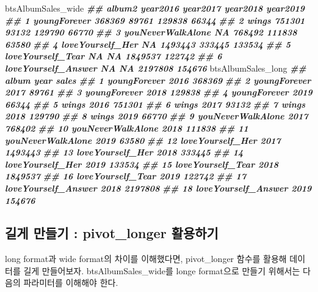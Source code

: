 \documentclass[
]{book}
\newenvironment{Shaded}{\begin{snugshade}}{\end{snugshade}}
\newcommand{\DocumentationTok}[1]{\textcolor[rgb]{0.56,0.35,0.01}{\textbf{\textit{#1}}}}
\newcommand{\NormalTok}[1]{#1}
\begin{document}
\begin{Shaded}
\begin{Highlighting}[]
\NormalTok{btsAlbumSales\_wide}
\DocumentationTok{\#\#                album2 year2016 year2017 year2018 year2019}
\DocumentationTok{\#\# 1        youngForever   368369    89761   129838    66344}
\DocumentationTok{\#\# 2               wings   751301    93132   129790    66770}
\DocumentationTok{\#\# 3   youNeverWalkAlone       NA   768492   111838    63580}
\DocumentationTok{\#\# 4    loveYourself\_Her       NA  1493443   333445   133534}
\DocumentationTok{\#\# 5   loveYourself\_Tear       NA       NA  1849537   122742}
\DocumentationTok{\#\# 6 loveYourself\_Answer       NA       NA  2197808   154676}
\NormalTok{btsAlbumSales\_long}
\DocumentationTok{\#\#                  album year   sales}
\DocumentationTok{\#\# 1         youngForever 2016  368369}
\DocumentationTok{\#\# 2         youngForever 2017   89761}
\DocumentationTok{\#\# 3         youngForever 2018  129838}
\DocumentationTok{\#\# 4         youngForever 2019   66344}
\DocumentationTok{\#\# 5                wings 2016  751301}
\DocumentationTok{\#\# 6                wings 2017   93132}
\DocumentationTok{\#\# 7                wings 2018  129790}
\DocumentationTok{\#\# 8                wings 2019   66770}
\DocumentationTok{\#\# 9    youNeverWalkAlone 2017  768402}
\DocumentationTok{\#\# 10   youNeverWalkAlone 2018  111838}
\DocumentationTok{\#\# 11   youNeverWalkAlone 2019   63580}
\DocumentationTok{\#\# 12    loveYourself\_Her 2017 1493443}
\DocumentationTok{\#\# 13    loveYourself\_Her 2018  333445}
\DocumentationTok{\#\# 14    loveYourself\_Her 2019  133534}
\DocumentationTok{\#\# 15   loveYourself\_Tear 2018 1849537}
\DocumentationTok{\#\# 16   loveYourself\_Tear 2019  122742}
\DocumentationTok{\#\# 17 loveYourself\_Answer 2018 2197808}
\DocumentationTok{\#\# 18 loveYourself\_Answer 2019  154676}
\end{Highlighting}
\end{Shaded}

\subsection{길게 만들기 : pivot\_longer 활용하기}\label{uxae38uxac8c-uxb9ccuxb4e4uxae30-pivot_longer-uxd65cuxc6a9uxd558uxae30}

long format과 wide format의 차이를 이해했다면, pivot\_longer 함수를 활용해 데이터를 길게 만들어보자. btsAlbumSales\_wide를 longe format으로 만들기 위해서는 다음의 파라미터를 이해해야 한다.
\end{document}
